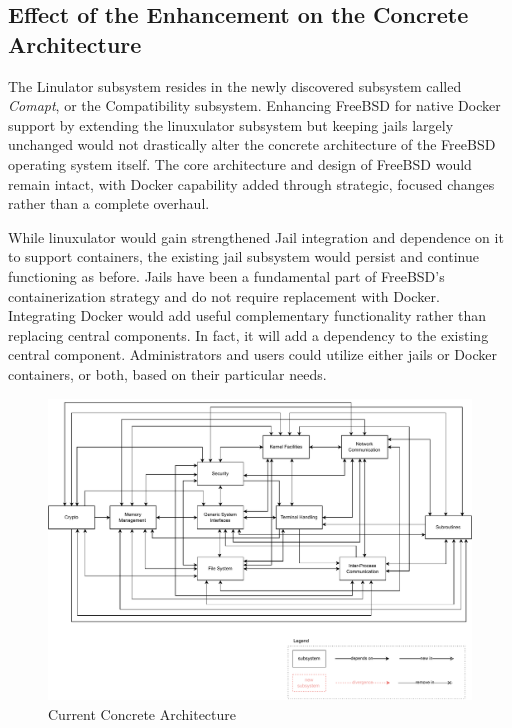 \documentclass[12pt, dvipsnames, a4paper]{article}
\begin{document}
\subsection{Effect of the Enhancement on the Concrete Architecture}
The Linulator subsystem resides in the newly discovered subsystem called \emph{Comapt}, or the Compatibility subsystem. Enhancing FreeBSD for native Docker support by extending the linuxulator subsystem but keeping jails largely unchanged would not drastically alter the concrete architecture of the FreeBSD operating system itself. The core architecture and design of FreeBSD would remain intact, with Docker capability added through strategic, focused changes rather than a complete overhaul.

While linuxulator would gain strengthened Jail integration and dependence on it to support containers, the existing jail subsystem would persist and continue functioning as before. Jails have been a fundamental part of FreeBSD's containerization strategy and do not require replacement with Docker. Integrating Docker would add useful complementary functionality rather than replacing central components. In fact, it will add a dependency to the existing central component. Administrators and users could utilize either jails or Docker containers, or both, based on their particular needs.

\begin{figure}[!htb]
	\center
	\includegraphics[width = 450pt]{assets/architecture_diagrams/current-concrete-architecture.pdf}
	\caption{Current Concrete Architecture}
\end{figure}
\end{document}
